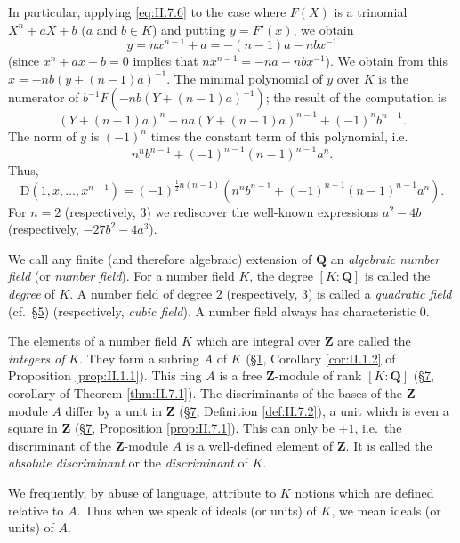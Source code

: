In particular, applying \eqref{eq:II.7.6} to the case where $F(X)$ is a
trinomial $X^{n}+aX+b$ ($a$ and $b\in K$) and putting $y=F'(x)$, we obtain
\[
y=nx^{n-1}+a=-(n-1)a-nbx^{-1}
\]
(since $x^{n}+ax+b=0$ implies that $nx^{n-1}=-na-nbx^{-1}$). We obtain from
this $x=-nb(y+(n-1)a)^{-1}$. The minimal polynomial of $y$ over $K$ is the
numerator of $b^{-1}F(-nb(Y+(n-1)a)^{-1})$; the result of the computation is
\[
(Y+(n-1)a)^{n}-na(Y+(n-1)a)^{n-1}+(-1)^{n}b^{n-1}.
\]
The norm of $y$ is $(-1)^{n}$ times the constant term of this polynomial,
i.e.
\[
n^{n}b^{n-1}+(-1)^{n-1}(n-1)^{n-1}a^{n}.
\]
Thus,
\begin{equation}
\mathrm{D}(1,x,\ldots,x^{n-1})=(-1)^{\frac{1}{2}n(n-1)}
\left(n^{n}b^{n-1}+(-1)^{n-1}(n-1)^{n-1}a^{n}\right).
\label{eq:II.7.7}
\end{equation}
For $n=2$ (respectively, $3$) we rediscover the well-known expressions
$a^{2}-4b$ (respectively, $-27b^{2}-4a^{3}$).


We call any finite (and therefore algebraic) extension of $\mathbf{Q}$ an
\emph{algebraic number field} (or \emph{number field}). For a number field
$K$, the degree $[K:\mathbf{Q}]$ is called the \emph{degree} of $K$. A number
field of degree $2$ (respectively, $3$) is called a \emph{quadratic field}
(cf.\ \hyperref[sec:2.5]{§5}) (respectively, \emph{cubic field}). A number field always has
characteristic $0$.

The elements of a number field $K$ which are integral over $\mathbf{Z}$ are
called the \emph{integers of} $K$. They form a subring $A$ of $K$ (\hyperref[sec:2.1]{§1},
Corollary \ref{cor:II.1.2} of Proposition \ref{prop:II.1.1}). This ring $A$
is a free $\mathbf{Z}$-module of rank $[K:\mathbf{Q}]$ (\hyperref[sec:2.7]{§7}, corollary of
Theorem \ref{thm:II.7.1}). The discriminants of the bases of the
$\mathbf{Z}$-module $A$ differ by a unit in $\mathbf{Z}$ (\hyperref[sec:2.7]{§7}, Definition
\ref{def:II.7.2}), a unit which is even a square in $\mathbf{Z}$ (\hyperref[sec:2.7]{§7},
Proposition \ref{prop:II.7.1}). This can only be $+1$, i.e.\ the
discriminant of the $\mathbf{Z}$-module $A$ is a well-defined element of
$\mathbf{Z}$. It is called the \emph{absolute discriminant} or the
\emph{discriminant} of $K$.

We frequently, by abuse of language, attribute to $K$ notions which are
defined relative to $A$. Thus when we speak of ideals (or units) of $K$, we
mean ideals (or units) of $A$.

